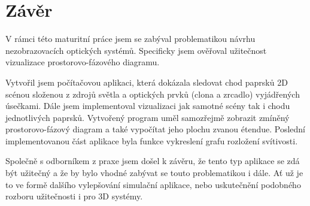 \chapter{Závěr}

V rámci této maturitní práce jsem se zabýval problematikou návrhu nezobrazovacích optických systémů. Specificky jsem ověřoval užitečnost vizualizace prostorovo-fázového diagramu.

Vytvořil jsem počítačovou aplikaci, která dokázala sledovat chod paprsků 2D scénou složenou z zdrojů světla a optických prvků (clona a zrcadlo) vyjádřených úsečkami. Dále jsem implementoval vizualizaci jak samotné scény tak i chodu jednotlivých paprsků. Vytvořený program uměl samozřejmě zobrazit zmíněný prostorovo-fázový diagram a také vypočítat jeho plochu zvanou étendue. Poslední implementovanou část aplikace byla funkce vykreslení grafu rozložení svítivosti.

Společně s odborníkem z praxe jsem došel k závěru, že tento typ aplikace se zdá být užitečný a že by bylo vhodné zabývat se touto problematikou i dále. Ať už je to ve formě dalšího vylepšování simulační aplikace, nebo uskutečnění podobného rozboru užitečnosti i pro 3D systémy.
